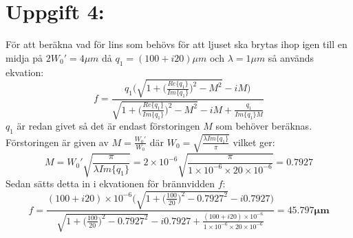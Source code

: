 \documentclass{article}
\begin{document}
\newpage
\section*{Uppgift 4:}
  För att beräkna vad för lins som behövs för att ljuset ska brytas ihop igen till en midja på $2W_0'=4\mu m$ då $q_1=(100+i20)\mu m$ och $\lambda=1\mu m$ så används ekvation:
  \[
    f=\frac{q_1\big(\sqrt{1+\big(\frac{Re\{q_1\}}{Im\{q_1\}}\big)^2-M^2}-iM\big)}{\sqrt{1+\big(\frac{Re\{q_1\}}{Im\{q_1\}}\big)^2-M^2}-iM+\frac{q_1}{Im\{q_1\}M}}
  \]
  $q_1$ är redan givet så det är endast förstoringen $M$ som behöver beräknas. Förstoringen är given av $M=\frac{W_0'}{W_0}$ där $W_0=\sqrt{\frac{\lambda Im\{q_1\}}{\pi}}$ vilket ger:
  \[
    M=W_0'\sqrt{\frac{\pi}{\lambda Im\{q_1\}}}=2\times10^{-6}\sqrt{\frac{\pi}{1\times10^{-6}\times20\times10^{-6}}}=0.7927
  \]
  Sedan sätts detta in i ekvationen för brännvidden $f$:
  \[
    f=\frac{(100+i20)\times10^{-6}\big(\sqrt{1+\big(\frac{100}{20}\big)^2-0.7927^2}-i0.7927\big)}{\sqrt{1+\big(\frac{100}{20}\big)^2-0.7927^2}-i0.7927+\frac{(100+i20)\times10^{-6}}{1\times10^{-6}\times20\times10^{-6}}}=\mathbf{45.797\mu m}
  \]
\end{document}
